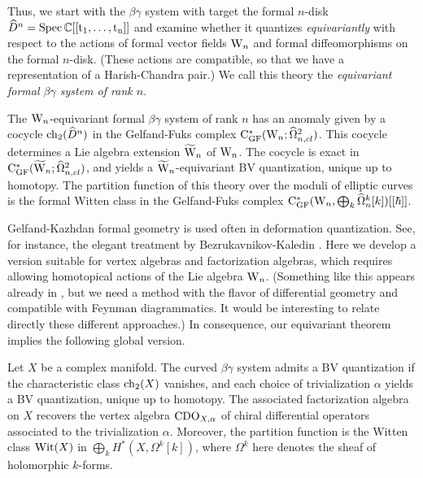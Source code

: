 Thus, we start with the $\beta\gamma$ system with target the formal $n$-disk $\widehat{D}^n = \rm{Spec}\,\mathbb C[[t_1,\ldots,t_n]]$ and examine whether it quantizes \emph{equivariantly} with respect to the actions of formal vector fields ${{\rm W}_n}$ and formal diffeomorphisms on the formal $n$-disk. (These actions are compatible, so that we have a representation of a Harish-Chandra pair.) We call this theory the \emph{equivariant formal $\beta\gamma$ system of rank $n$}.

\begin{thm*}
The ${{\rm W}_n}$-equivariant formal $\beta\gamma$ system of rank $n$ has an anomaly given by a cocycle ${\rm ch}_2(\widehat{D}^n)$ in the Gelfand-Fuks  complex ${\rm C}^*_{{\rm GF}}({{\rm W}_n} ; \widehat{\Omega}^2_{n,cl})$. This cocycle determines a Lie algebra extension $\widetilde{{{\rm W}}}_n$ of ${{\rm W}_n}$. The cocycle is exact in ${\rm C}^*_{{\rm GF}}(\widetilde{{{\rm W}}}_n ; \widehat{\Omega}^2_{n,cl})$, and yields a $\widetilde{{{\rm W}}}_n$-equivariant BV quantization, unique up to homotopy. The partition function of this theory over the moduli of elliptic curves is the formal Witten class in the Gelfand-Fuks  complex ${\rm C}^*_{{\rm GF}}({{\rm W}_n}, \bigoplus_k \widehat{\Omega}_n^k[k])[[\hbar]]$.
\end{thm*}

Gelfand-Kazhdan formal geometry is used often in deformation quantization. See, for instance, the elegant treatment by Bezrukavnikov-Kaledin \cite{BK}. Here we develop a version suitable for vertex algebras and factorization algebras, which requires allowing homotopical actions of the Lie algebra ${{\rm W}_n}$. (Something like this appears already in \cite{BD,KV,Malikov2008}, but we need a method with the flavor of differential geometry and compatible with Feynman diagrammatics. It would be interesting to relate directly these different approaches.) In consequence, our equivariant theorem implies the following global version.
 
\begin{thm*}
Let $X$ be a complex manifold. The curved $\beta\gamma$ system admits a BV quantization if the characteristic class ${\rm ch}_2(X)$ vanishes, and each choice of trivialization $\alpha$ yields a BV quantization, unique up to homotopy. The associated factorization algebra on $X$ recovers the vertex algebra ${\rm CDO}_{X,\alpha}$ of chiral differential operators associated to the trivialization $\alpha$. Moreover, the partition function is the Witten class ${\rm Wit}(X)$ in $\bigoplus_k H^*(X, \Omega^k[k])$, where $\Omega^k$ here denotes the sheaf of holomorphic $k$-forms.
\end{thm*}

